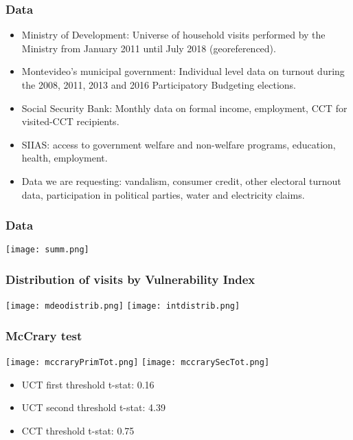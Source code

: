 \documentclass{beamer}
\begin{document}
\begin{frame}
\frametitle{Data}
\begin{itemize}
	\item Ministry of Development: Universe of household visits performed by the Ministry from January 2011 until July 2018 {\color{gray}(georeferenced)}.
	\item Montevideo's municipal government: Individual level data on turnout during the 2008, 2011, 2013 and 2016 Participatory Budgeting elections.
	\item {\color{gray}Social Security Bank: Monthly data on formal income, employment, CCT for visited-CCT recipients.}	
	\item {\color{gray}SIIAS: access to government welfare and non-welfare programs, education, health, employment.}
	\item {\color{gray}Data we are requesting: vandalism, consumer credit, other electoral turnout data, participation in political parties, water and electricity claims.}
\end{itemize}
\end{frame}

\begin{frame}
\frametitle{Data}
\begin{center}
	\texttt{[image: summ.png]}
	\label{summ}
\end{center}
\end{frame}

\begin{frame}
\frametitle{Distribution of visits by Vulnerability Index}
\begin{center}
	\texttt{[image: mdeodistrib.png]}
	\texttt{[image: intdistrib.png]}
	\label{dist}
\end{center}
\end{frame}

\begin{frame}
\frametitle{McCrary test}
	\begin{center}
		\texttt{[image: mccraryPrimTot.png]} 
		\texttt{[image: mccrarySecTot.png]}
		\label{mccrary}
	\end{center}
	\begin{itemize}
		\item UCT first threshold t-stat: 0.16
		\item UCT second threshold t-stat: 4.39
		\item CCT threshold t-stat: 0.75
	\end{itemize}
\end{frame}
\end{document}
